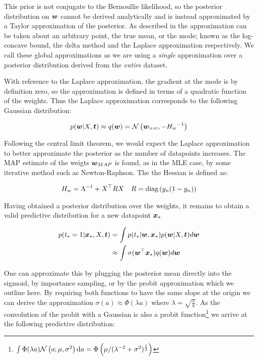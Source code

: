 This prior is not conjugate to the Bernoullie likelihood, so the posterior distribution on $\bm w$ cannot be derived analytically and is instead approximated by a Taylor approximation of the posterior. As described in \cite{Wang2013} the approximation can be taken about an arbitrary point, the true mean, or the mode; known as the log-concave bound, the delta method and the Laplace approximation respectively. We call these global approximations as we are using a \emph{single} approximation over a posterior distribution derived from the \emph{entire} dataset.

With reference to the Laplace approximation, the gradient at the mode is by definition zero, so the approximation is defined in terms of a quadratic function of the weights. Thus the Laplace approximation corresponds to the following Gaussian distribution:

\begin{equation}
p(\bm w|X,\bm t) \approx q(\bm w) = \mathcal{N} \left( {\bm w_{\text{\tiny \sc MAP}}}, {-{H_w}^{-1}} \right)
\end{equation}

Following the central limit theorem, we would expect the Laplace approximation to better approximate the posterior as the number of datapoints increases. The MAP estimate of the weigts $\bm w_{MAP}$ is found, as in the MLE case, by some iterative method such as Newton-Raphson. The the Hessian is defined as:

\begin{align}
H_w   & = {\Lambda}^{-1} + X^\top R X & R = \text{diag} \left( {y_n(1 - y_n)} \right) 
\end{align}

Having obtained a posterior distribution over the weights, it remains to obtain a valid predictive distribution for a new datapoint $\bm x_*$

\begin{align}
p(t_* = 1| \bm x_*, X, \bm t) & = \int p(t_*|\bm w, \bm x_*)p(\bm w|X,\bm t) d\bm w \\
 & \approx \int \sigma(\bm w^\top\bm x_*)q(\bm w) d\bm w
\end{align}

One can approximate this by plugging the posterior mean directly into the sigmoid, by importance sampling, or by the probit approximation\cite{Barber1998} which we outline here. By requiring both functions to have the same slope at the origin we can derive the approximation $\sigma(a) \approx \Phi(\lambda a)$ where $\lambda = \sqrt{\frac{\pi}{8}}$. As the convolution of the probit with a Gaussian is also a probit function\footnote{$\int \Phi(\lambda a)\mathcal{N} \left(a; \mu, \sigma^2\right) \text{d}a = \Phi\left(\mu / (\lambda^{-2} + \sigma^2)^{\frac{1}{2}} \right)$} we arrive at the following predictive distribution:

